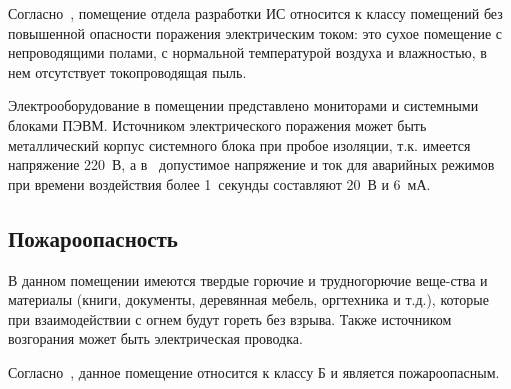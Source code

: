 Согласно~\cite{PUE7}, помещение отдела разработки ИС относится к классу помещений без повышенной опасности поражения электрическим током: это сухое помещение с непроводящими полами, с нормальной температурой воздуха и влажностью, в нем отсутствует токопроводящая пыль.

Электрооборудование в помещении представлено мониторами и системными блоками ПЭВМ. Источником электрического поражения может быть металлический корпус системного блока при пробое изоляции, т.к. имеется напряжение 220~В, а в~\cite{GOST12_1_038} допустимое напряжение и ток для аварийных режимов при времени воздействия более 1~секунды составляют 20~В и 6~мА.

\subsection{Пожароопасность}
В данном помещении имеются твердые горючие и  трудногорючие веще-ства и материалы (книги, документы, деревянная мебель, оргтехника и т.д.), которые при взаимодействии с огнем будут гореть без взрыва. Также источником возгорания может быть электрическая проводка.

Согласно~\cite{GOST12_1_004}, данное помещение относится к классу Б и является пожароопасным.